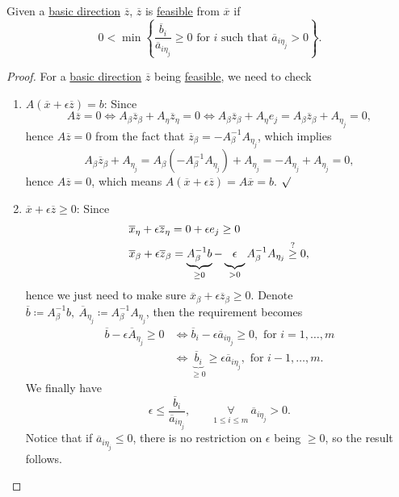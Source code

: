 \begin{lemma}\label{lma:lec6-1}
	Given a \hyperref[def:basic-direction]{basic direction} \(\overline{z}\), \(\overline{z}\) is \hyperref[def:feasible-direction]{feasible} from \(\overline{x}\) if
	\[
		0< \min\left\{\frac{\overline{b}_i}{\overline{a}_{i \eta_{j}}}\geq 0 \text{ for }i \text{ such that }\overline{a}_{i \eta_{j}}>0\right\}.
	\]
\end{lemma}
\begin{proof}
	For a \hyperref[def:basic-direction]{basic direction} \(\overline{z}\) being \hyperref[def:feasible-direction]{feasible}, we need to check
	\begin{enumerate}
		\item \(A(\overline{x} + \epsilon \overline{z}) = b\):
		      Since \[
			      A \overline{z} = 0 \iff A_{\beta}\overline{z}_{\beta} + A_{\eta}\overline{z}_{\eta} = 0 \iff A_{\beta}\overline{z}_{\beta}+A_{\eta}e_{j} = A_{\beta}\overline{z}_{\beta}+A_{\eta_j} = 0,
		      \]
		      hence \(A \overline{z} = 0\) from the fact that \(\overline{z} _\beta = - A_\beta ^{-1} A_{\eta _{j} }\), which implies
		      \[
			      A_\beta \overline{z} _\beta + A_{\eta _{j} } = A_\beta (- A_\beta ^{-1} A_{\eta _{j} }) + A_{\eta _{j} } = -A_{\eta _{j} } + A_{\eta _{j} } = 0,
		      \]
		      hence \(A \overline{z} = 0\), which means \(A(\overline{x} +\epsilon \overline{z} ) = A \overline{x} = b\). \(\surd\)
		\item \(\overline{x} + \epsilon \overline{z} \geq 0\):
		      Since
		      \[
			      \begin{split}
				      &\overline{x}_{\eta} + \epsilon \overline{z}_{\eta} = 0 + \epsilon e_j \geq  0\\
				      &\overline{x}_{\beta}+ \epsilon \overline{z}_{\beta} = \underbrace{A^{-1}_{\beta}b}_{\geq 0} - \underbrace{\vphantom{A^{-1}_{\beta}}\epsilon}_{>0} A^{-1}_{\beta}A_{\eta_j}\overset{?}{\geq} 0,
			      \end{split}
		      \]
		      hence we just need to make sure \(\overline{x} _\beta + \epsilon \overline{z} _\beta \geq 0\). Denote
		      \(\overline{b} \coloneqq A^{-1}_{\beta} b,\ \overline{A}_{\eta_j} \coloneqq A^{-1}_{\beta}A_{\eta_j}\), then the requirement becomes
		      \[
			      \begin{split}
				      \overline{b} - \epsilon \overline{A}_{\eta_{j}}\geq 0 &\iff \overline{b}_i - \epsilon \overline{a}_{i \eta_{j}}\geq 0, \text{ for }i = 1, \ldots , m\\
				      &\iff \underbrace{\overline{b}_i}_{\geq 0} \geq \epsilon \overline{a}_{i \eta_{j}}, \text{ for }i - 1, \ldots , m.
			      \end{split}
		      \]
		      We finally have
		      \[
			      \epsilon \leq \frac{\overline{b}_i}{\overline{a}_{i \eta_j}},\qquad \underset{1\leq i\leq m}{\forall}\  \overline{a}_{i \eta_{j}}>0.
		      \]
		      Notice that if \(\overline{a}_{i \eta_{j}}\leq 0\), there is no restriction on \(\epsilon\) being \(\geq 0\), so the result follows.
	\end{enumerate}
\end{proof}

